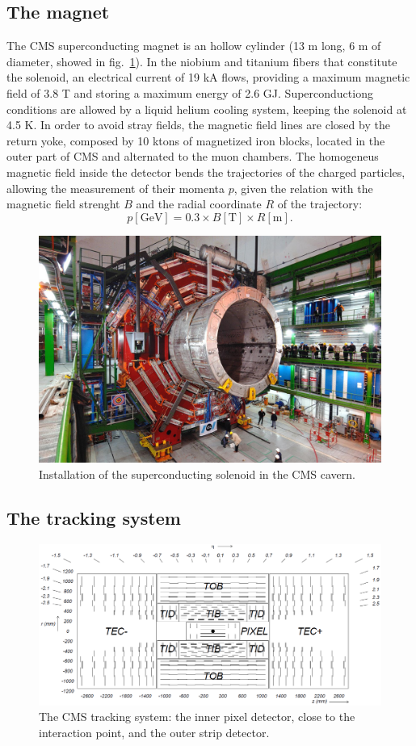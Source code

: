 \subsection{The magnet}
The CMS superconducting magnet is an hollow cylinder (13 m long, 6 m of diameter, showed in fig.~\ref{fig:CMS_solenoid}). In the niobium and titanium fibers that constitute the solenoid, an electrical current of 19 kA flows, providing a maximum magnetic field of 3.8 T and storing a maximum energy of 2.6 GJ. Superconductiong conditions are allowed by a liquid helium cooling system, keeping the solenoid at 4.5 K. In order to avoid stray fields, the magnetic field lines are closed by the return yoke, composed by 10 ktons of magnetized iron blocks, located in the outer part of CMS and alternated to the muon chambers. The homogeneus magnetic field inside the detector bends the trajectories of the charged particles, allowing the measurement of their momenta $p$, given the relation with the magnetic field strenght $B$ and the radial coordinate $R$ of the trajectory:
\begin{equation}
p [\text{GeV}] = 0.3 \times B [\text{T}] \times R [\text{m}]. 
\end{equation}

\begin{figure}[!htb]
  \centering
    \includegraphics[width=.5\textwidth]{figures/CMS_solenoid.jpeg}
  \caption{Installation of the superconducting solenoid in the CMS cavern.}
  \label{fig:CMS_solenoid}
\end{figure}

\subsection{The tracking system}
\begin{figure}[!htb]
  \centering
    \includegraphics[width=.9\textwidth]{figures/cmstracker.png}
  \caption{The CMS tracking system: the inner pixel detector, close to the interaction point, and the outer strip detector.}
  \label{fig:CMS_tracker}
\end{figure}

